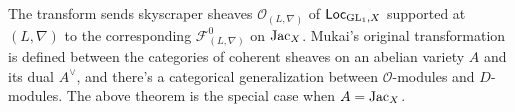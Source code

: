 The transform sends skyscraper sheaves $\mathcal{O}_{(L, \nabla)}$ of $\operatorname{\mathsf{Loc}}_{\operatorname{\mathrm{GL}}_1, X}$ supported at $(L, \nabla)$ to 
the corresponding $\mathcal{F}_{(L,\nabla)}^{0}$ on $\operatorname{\mathrm{Jac}}_X$.
Mukai's original transformation is defined between the categories of coherent sheaves on an abelian 
variety $A$ and its dual $A^{\vee}$, and there's a categorical generalization between $\mathcal{O}$-modules and $D$-modules.
The above theorem is the special case when $A = \operatorname{\mathrm{Jac}}_X$.